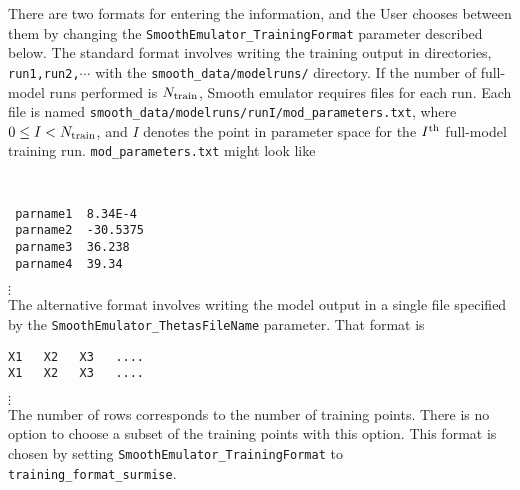 \documentclass[UserManual.tex]{subfiles}
\begin{document}
\begin{enumerate}
There are two formats for entering the information, and the User chooses between them by changing the {\tt SmoothEmulator\_TrainingFormat} parameter described below. The standard format involves writing the training output in directories, {\tt run1,run2,}$\cdots$ with the {\tt smooth\_data/modelruns/} directory. If the number of full-model runs performed is $N_{\rm train}$, Smooth emulator requires files for each run. Each file is named {\tt smooth\_data/modelruns/runI/mod\_parameters.txt}, where $0\le I<N_{\rm train}$, and $I$ denotes the point in  parameter space for the $I^{\rm th}$ full-model training run. {\tt mod\_parameters.txt} might look like
{\tt
\begin{verbatim}
 parname1  8.34E-4
 parname2  -30.5375
 parname3  36.238
 parname4  39.34
\end{verbatim}}
\vspace*{-16pt}
 \hspace*{28pt}$\vdots$\\

The alternative format involves writing the model output in a single file specified by the {\tt SmoothEmulator\_ThetasFileName} parameter. That format is
\vspace*{-8pt}
{\tt\begin{verbatim}
X1   X2   X3   ....
X1   X2   X3   ....
\end{verbatim}}
\vspace*{-16pt}
 \hspace*{28pt}$\vdots$\\
 
The number of rows corresponds to the number of training points. There is no option to choose a subset of the training points with this option. This format is chosen by setting {\tt SmoothEmulator\_TrainingFormat} to {\tt training\_format\_surmise}.


\end{enumerate}
\end{document}
